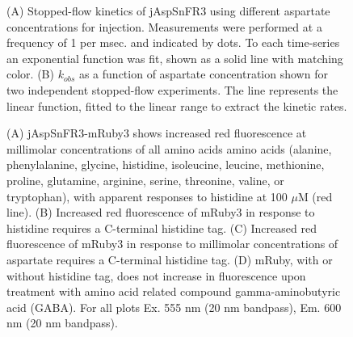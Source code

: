 \begin{figure}[ht]
    \centering
    \caption[Stopped-flow kinetics.]{
    (A) Stopped-flow kinetics of jAspSnFR3 using different aspartate concentrations for injection.
    Measurements were performed at a frequency of 1 per msec. and indicated by dots.
    To each time-series an exponential function was fit, shown as a solid line with matching color.
    (B) $k_{obs}$ as a function of aspartate concentration shown for two independent stopped-flow experiments.
    The line represents the linear function, fitted to the linear range to extract the kinetic rates.
    }
    \label{ch3:figsupp:f1S3}
\end{figure}

\begin{figure}[ht]
    \centering
    \caption[mRuby3 interaction with histidine tag.]{
    (A) jAspSnFR3-mRuby3 shows increased red fluorescence at millimolar concentrations of all amino acids amino acids (alanine, phenylalanine, glycine, histidine, isoleucine, leucine, methionine, proline, glutamine, arginine, serine, threonine, valine, or tryptophan), with apparent responses to histidine at 100 $\mu$M (red line).
    (B) Increased red fluorescence of mRuby3 in response to histidine requires a C-terminal histidine tag.
    (C) Increased red fluorescence of mRuby3 in response to millimolar concentrations of aspartate requires a C-terminal histidine tag.
    (D) mRuby, with or without histidine tag, does not increase in fluorescence upon treatment with amino acid related compound gamma-aminobutyric acid (GABA).
    For all plots Ex. 555 nm (20 nm bandpass), Em. 600 nm (20 nm bandpass).
    }
    \label{ch3:figsupp:f1S4}
\end{figure}

